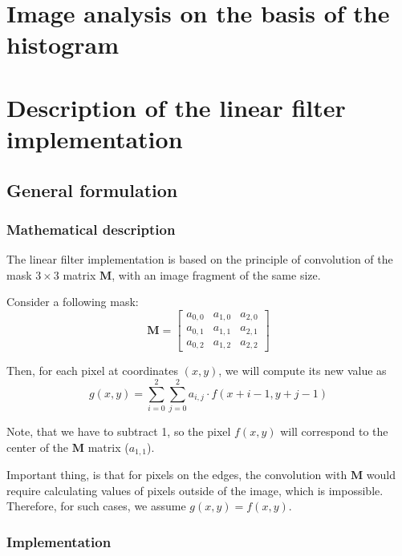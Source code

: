\documentclass[12pt]{article}
\begin{document}
\section{Image analysis on the basis of the histogram}

\section{Description of the linear filter implementation}

\subsection{General formulation}

\subsubsection{Mathematical description}

The linear filter implementation is based on the principle of convolution of the mask $3\times3$ matrix $\mathbf{M}$, with an image fragment of the same size.

Consider a following mask:
\begin{equation}
    \mathbf{M} = \begin{bmatrix}
        a_{0,0} & a_{1,0} & a_{2,0} \\
        a_{0,1} & a_{1,1} & a_{2,1} \\
        a_{0,2} & a_{1,2} & a_{2,2}
    \end{bmatrix}
\end{equation}

Then, for each pixel at coordinates $(x,y)$, we will compute its new value as
\begin{equation}
    g(x,y) = \sum\limits_{i=0}^2 \sum\limits_{j=0}^2 a_{i,j} \cdot f(x + i - 1, y + j - 1)
\end{equation}

Note, that we have to subtract 1, so the pixel $f(x,y)$ will correspond to the center of the $\mathbf{M}$ matrix ($a_{1,1}$).

Important thing, is that for pixels on the edges,
the convolution with $\mathbf{M}$ would require calculating values of pixels outside of the image, which is impossible.
Therefore, for such cases, we assume $g(x,y) = f(x,y)$.

\subsubsection{Implementation}
\end{document}
